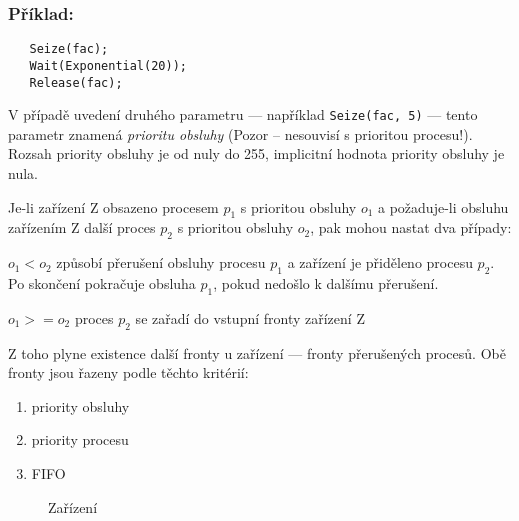 \documentclass[a4paper]{article}
\begin{document}
\subsubsection*{Příklad:}  %

\begin{verbatim}
   Seize(fac);
   Wait(Exponential(20));
   Release(fac);
\end{verbatim}

V případě uvedení druhého parametru --- například \verb|Seize(fac, 5)| ---
tento parametr znamená {\em prioritu obsluhy} (Pozor -- nesouvisí s prioritou
procesu!).  Rozsah priority obsluhy je od nuly do 255, implicitní hodnota
priority obsluhy je nula.

Je-li zařízení Z obsazeno procesem $p_1$ s prioritou obsluhy $o_1$
a požaduje-li obsluhu zařízením Z další proces $p_2$ s prioritou
obsluhy $o_2$, pak mohou nastat dva případy:

\begin{description}

\item{$o_1 < o_2$}  
         způsobí přerušení obsluhy procesu $p_1$ a zařízení je
         přiděleno procesu $p_2$. Po skončení pokračuje obsluha
         $p_1$, pokud nedošlo k dalšímu přerušení.

\item{$o_1 >= o_2$}   
         proces $p_2$ se zařadí do vstupní fronty zařízení Z
         
\end{description}

Z toho plyne existence další fronty u zařízení --- fronty
přerušených procesů. Obě fronty jsou řazeny podle těchto
kritérií:

\begin{enumerate}
\item  priority obsluhy
\item  priority procesu
\item  FIFO
\end{enumerate}

%

\begin{figure}[ht]
  \begin{center}
    \caption{Zařízení}
    \label{o2}
  \end{center}
\end{figure}
\end{document}
